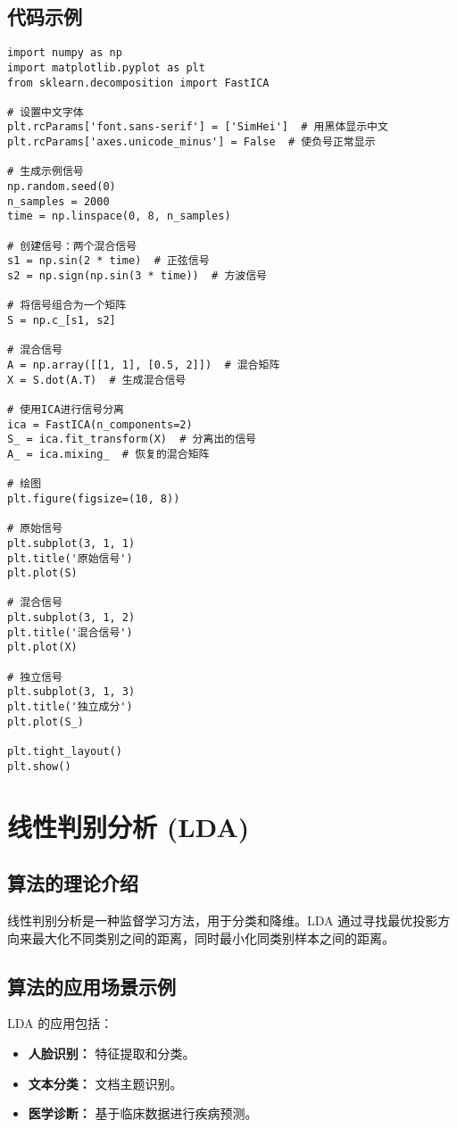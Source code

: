 \subsection*{代码示例}
\begin{lstlisting}
import numpy as np
import matplotlib.pyplot as plt
from sklearn.decomposition import FastICA

# 设置中文字体
plt.rcParams['font.sans-serif'] = ['SimHei']  # 用黑体显示中文
plt.rcParams['axes.unicode_minus'] = False  # 使负号正常显示

# 生成示例信号
np.random.seed(0)
n_samples = 2000
time = np.linspace(0, 8, n_samples)

# 创建信号：两个混合信号
s1 = np.sin(2 * time)  # 正弦信号
s2 = np.sign(np.sin(3 * time))  # 方波信号

# 将信号组合为一个矩阵
S = np.c_[s1, s2]

# 混合信号
A = np.array([[1, 1], [0.5, 2]])  # 混合矩阵
X = S.dot(A.T)  # 生成混合信号

# 使用ICA进行信号分离
ica = FastICA(n_components=2)
S_ = ica.fit_transform(X)  # 分离出的信号
A_ = ica.mixing_  # 恢复的混合矩阵

# 绘图
plt.figure(figsize=(10, 8))

# 原始信号
plt.subplot(3, 1, 1)
plt.title('原始信号')
plt.plot(S)

# 混合信号
plt.subplot(3, 1, 2)
plt.title('混合信号')
plt.plot(X)

# 独立信号
plt.subplot(3, 1, 3)
plt.title('独立成分')
plt.plot(S_)

plt.tight_layout()
plt.show()

\end{lstlisting}


\section{线性判别分析 (LDA)}
\subsection*{算法的理论介绍}
线性判别分析是一种监督学习方法，用于分类和降维。LDA 通过寻找最优投影方向来最大化不同类别之间的距离，同时最小化同类别样本之间的距离。

\subsection*{算法的应用场景示例}
LDA 的应用包括：
\begin{itemize}
    \item \textbf{人脸识别：} 特征提取和分类。
    \item \textbf{文本分类：} 文档主题识别。
    \item \textbf{医学诊断：} 基于临床数据进行疾病预测。
\end{itemize}

